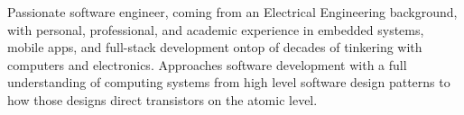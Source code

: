 

\begin{cvparagraph}

Passionate software engineer, coming from an Electrical Engineering background, with personal, professional, and academic experience in embedded systems, mobile apps, and full-stack development ontop of decades of tinkering with computers and electronics. Approaches software development with a full understanding of computing systems from high level software design patterns to how those designs direct transistors on the atomic level.

\end{cvparagraph}

